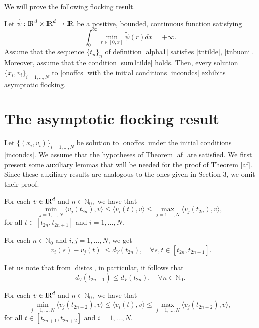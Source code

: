 \documentclass[a4paper,11pt,oneside]{article}
\newcommand{\RR}{{{\rm I} \kern -.15em {\rm R} }}
\begin{document}
We will prove the following flocking result.
\begin{thm}\label{af}
	Let $\tilde\psi:\RR^d\times \RR^d\rightarrow\RR$ be a positive, bounded, continuous function satisfying \begin{equation}\label{infint}
		\int_{0}^{\infty}\min_{r\in [0,x]}\tilde \psi(r)dx=+\infty.
	\end{equation} Assume that the sequence $\{t_{n}\}_{n}$ of definition \eqref{alpha1} satisfies \eqref{tntilde}, \eqref{tnbuoni}. Moreover, assume that the condition \eqref{sum1tilde} holds.
	Then, every solution $\{x_{i},v_{i}\}_{i=1,\dots,N}$ to \eqref{onoffcs} with the initial conditions \eqref{incondcs} exhibits asymptotic flocking.
	\end{thm}
\section{The asymptotic flocking result}
\setcounter{equation}{0}

\noindent Let $\{(x_{i},v_{i})\}_{i=1,\dots,N}$ be solution to \eqref{onoffcs} under the initial conditions \eqref{incondcs}. We assume that the hypotheses of Theorem \ref{af} are satisfied. We first present some auxiliary lemmas that will be needed for the proof of Theorem \ref{af}. Since these auxiliary results are analogous to the ones given in Section 3, we omit their proof.
\begin{lem}\label{L1cs}
	For each $v\in \RR^{d}$ and $n\in \mathbb{N}_0,$  we have that 
	\begin{equation}\label{scalprcs}
		\min_{j=1,\dots,N}\langle v_{j}(t_{2n}),v\rangle\leq \langle v_{i}(t),v\rangle\leq \max_{j=1,\dots,N}\langle v_{j}(t_{2n}),v\rangle,
	\end{equation}for all  $t\in [t_{2n},t_{2n+1}]$ and $i=1,\dots,N$. 
\end{lem}

\begin{lem}\label{L2cs}
	For each $n\in \mathbb{N}_{0}$ and $i,j=1,\dots,N$, we get \begin{equation}
		\label{distcs}
		\lvert v_{i}(s)-v_{j}(t)\rvert\leq d_{V}(t_{2n}), \quad\forall s,t\in [t_{2n},t_{2n+1}].
	\end{equation} 
\end{lem}
\begin{oss}
	Let us note that from \eqref{distcs}, in particular, it follows that
	\begin{equation}\label{deccs}
		d_{V}(t_{2n+1})\leq d_{V}(t_{2n}),\quad \forall n\in \mathbb{N}_{0}.
	\end{equation}
	
\end{oss} 
\begin{lem}\label{L1-1cs}
	For each $v\in \RR^{d}$ and $n\in \mathbb{N}_0,$  we have that 
	\begin{equation}\label{scalpr-1cs}
		\min_{j=1,\dots,N}\langle v_{j}(t_{2n+2}),v\rangle\leq \langle v_{i}(t),v\rangle\leq \max_{j=1,\dots,N}\langle v_{j}(t_{2n+2}),v\rangle,
	\end{equation}for all  $t\in [t_{2n+1},t_{2n+2}]$ and $i=1,\dots,N$. 
\end{lem}
\end{document}
